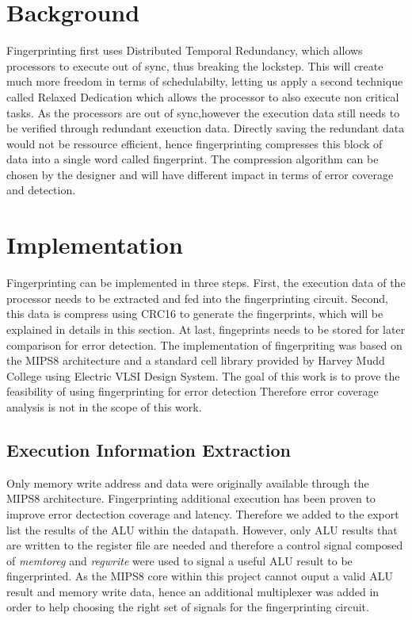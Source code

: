 \documentclass[10pt,journal,compsoc]{IEEEtran}
\begin{document}
\section{Background}
Fingerprinting first uses Distributed Temporal Redundancy, which allows processors to execute out of sync\cite{DTR}, thus breaking the lockstep. This will create much more freedom in terms of schedulabilty, letting us apply a second technique called Relaxed Dedication which allows the processor to also execute non critical tasks\cite{RD}. 
As the processors are out of sync,however the execution data still needs to be verified through redundant exeuction data. Directly saving the redundant data would not be ressource efficient, hence fingerprinting compresses this block of data into a single word called fingerprint. The compression algorithm can be chosen by the designer and will have different impact in terms of error coverage and detection. 

\section{Implementation }
Fingerprinting can be implemented in three steps. First, the execution data of the processor needs to be extracted and fed into the fingerprinting circuit. Second, this data is compress using CRC16 to generate the fingerprints, which will be explained in details in this section. At last, fingeprints needs to be stored for later comparison for error detection. The implementation of fingerpriting was based on the MIPS8 architecture and a standard cell library provided by Harvey Mudd College\cite{harvey} using Electric VLSI Design System\cite{electric}. The goal of this work is to prove the feasibility of using fingerprinting for error detection Therefore error coverage analysis is not in the scope of this work.

\subsection{Execution Information Extraction}

Only memory write address and data were originally available through the MIPS8 architecture. Fingerprinting additional execution has been proven to improve error dectection coverage and latency\cite{techcon}. Therefore we added to the export list the results of the ALU within the datapath. However, only ALU results that are written to the register file are needed and therefore a control signal composed of \emph{memtoreg} and \emph{regwrite} were used to signal a useful ALU result to be fingerprinted. As the MIPS8 core within this project  cannot ouput a valid ALU result and memory write data, hence an additional multiplexer was added in order to help choosing the right set of signals for the fingerprinting circuit.
\end{document}
